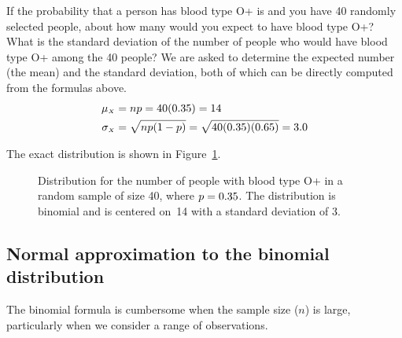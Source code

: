 \begin{examplewrap}
\begin{nexample}{If the probability that a person has blood type O+ is \oposprob{} and you have 40 randomly selected people, about how many would you expect to have blood type O+? What is the standard deviation of the number of people who would have blood type O+ among the 40 people?}
We are asked to determine the expected number (the mean) and the standard deviation, both of which can be directly computed from the formulas above. 
 \begin{align*}
\mu_{\scriptscriptstyle{X}}&=np = 40(0.35{}) = 14 \\
 \sigma_{\scriptscriptstyle{X}} &= \sqrt{np(1-p)} = \sqrt{40(0.35{})(0.65{})} = 3.0
\end{align*}%
\end{nexample}
\end{examplewrap}

The exact distribution is shown in Figure~\ref{oPositive40}.

\begin{figure}[ht]
\centering
{}
\caption{Distribution for the number of people with blood type O+ in a random sample of size 40, where $p=0.35{}$.  The distribution is binomial and is centered on~14 with a standard deviation of 3.  }
\label{oPositive40}
\end{figure}



\D{\newpage}

\subsection{Normal approximation to the binomial distribution}


The binomial formula is cumbersome when the sample size ($n$) is large, particularly when we consider a range of observations.

